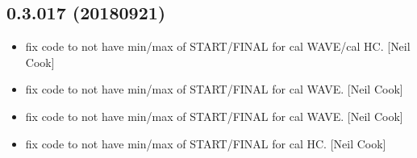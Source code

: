 \documentclass[a4paper,10pt,english]{report}
\begin{document}
\subsection{0.3.017 (2018\sphinxhyphen{}09\sphinxhyphen{}21)}
\label{\detokenize{misc/changelog:id334}}\begin{itemize}
\item {} 
 \sphinxhyphen{} fix code to not have min/max of 
START/FINAL for cal WAVE/cal HC. {[}Neil Cook{]}

\item {} 
 \sphinxhyphen{} fix code to not have min/max of 
START/FINAL for cal WAVE. {[}Neil Cook{]}

\item {} 
 \sphinxhyphen{} fix code to not have min/max of
 START/FINAL for cal WAVE. {[}Neil Cook{]}

\item {} 
 \sphinxhyphen{} fix code to not have min/max of 
START/FINAL for cal HC. {[}Neil Cook{]}

\end{itemize}
\end{document}
